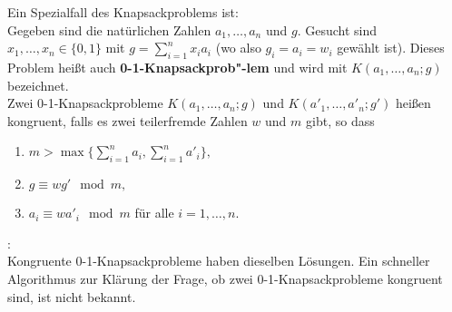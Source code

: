 \begin{refsegment}
Ein Spezialfall des Knapsackproblems ist:\\
Gegeben sind die natürlichen Zahlen $ a_1, \dots, a_n $   und $ g .$
Gesucht sind  $ x_1, \dots, x_n \in \{ 0,1\} $  mit $ g = \sum_{i=1}^{n}x_i a_i $  (wo also $ g_i = a_i = w_i $ gewählt ist).
Dieses Problem heißt auch  \textbf{0-1-Knapsackprob"-lem} und wird mit $ K(a_1, \dots, a_n;g) $  bezeichnet.\\

Zwei 0-1-Knapsackprobleme  $ K(a_1, \dots, a_n;g) $   und
$ K(a'_1, \dots, a'_n;g') $  heißen kongruent, falls es zwei
teilerfremde Zahlen $ w $ und $ m $
gibt, so dass
\begin{enumerate}
    \item $ m > \max \{ \sum_{i=1}^n a_i , \sum_{i=1}^n a'_i \}, $

    \item $ g \equiv wg' \mod m, $

    \item $ a_i \equiv w a'_i \mod m $ für alle $ i=1, \dots, n.$

\end{enumerate}

\begin{remark}{:}\\
Kongruente 0-1-Knapsackprobleme haben dieselben Lösungen.
Ein schneller Algorithmus zur Klärung der Frage, ob zwei 0-1-Knapsackprobleme kongruent sind, ist nicht bekannt.
\end{remark}


\end{refsegment}
